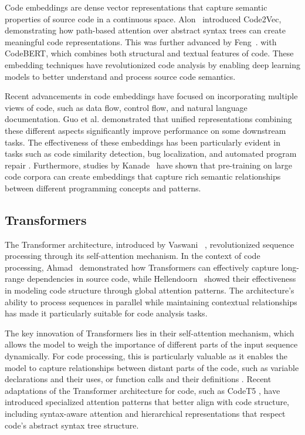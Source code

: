 Code embeddings are dense vector representations that capture semantic properties of source code in a continuous space. Alon~\etal{} \cite{Alon2019Code2vec} introduced Code2Vec, demonstrating how path-based attention over abstract syntax trees can create meaningful code representations. This was further advanced by Feng~\etal{}. \cite{feng2020codebert} with CodeBERT, which combines both structural and textual features of code. These embedding techniques have revolutionized code analysis by enabling deep learning models to better understand and process source code semantics.

Recent advancements in code embeddings have focused on incorporating multiple views of code, such as data flow, control flow, and natural language documentation. Guo et al. \cite{guo2022unixcoder} demonstrated that unified representations combining these different aspects significantly improve performance on some downstream tasks. The effectiveness of these embeddings has been particularly evident in tasks such as code similarity detection, bug localization, and automated program repair \cite{zhou2019devign}. Furthermore, studies by Kanade~\etal{} \cite{kanade2020learning} have shown that pre-training on large code corpora can create embeddings that capture rich semantic relationships between different programming concepts and patterns.

\subsection{Transformers}

The Transformer architecture, introduced by Vaswani~\etal{} \cite{vaswani2017attention}, revolutionized sequence processing through its self-attention mechanism. In the context of code processing, Ahmad~\etal{} \cite{ahmad2021} demonstrated how Transformers can effectively capture long-range dependencies in source code, while Hellendoorn~\etal{} \cite{hellendoorn2019global} showed their effectiveness in modeling code structure through global attention patterns. The architecture's ability to process sequences in parallel while maintaining contextual relationships has made it particularly suitable for code analysis tasks.

The key innovation of Transformers lies in their self-attention mechanism, which allows the model to weigh the importance of different parts of the input sequence dynamically. For code processing, this is particularly valuable as it enables the model to capture relationships between distant parts of the code, such as variable declarations and their uses, or function calls and their definitions \cite{wang2019self}. Recent adaptations of the Transformer architecture for code, such as CodeT5 \cite{wang2021codet5identifierawareunifiedpretrained}, have introduced specialized attention patterns that better align with code structure, including syntax-aware attention and hierarchical representations that respect code's abstract syntax tree structure.

